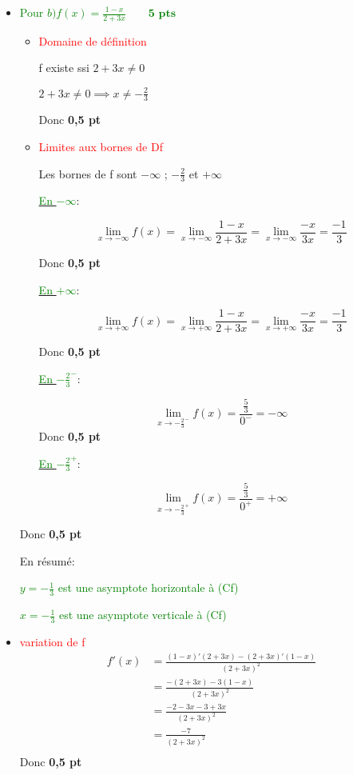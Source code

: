 \documentclass[12pt]{article}
\begin{document}
\begin{itemize}
\item \textcolor{green}{Pour $b)f(x)=\frac{1-x}{2+3x}\quad\quad\textbf{5 pts}$}
\begin{itemize}
\item \textcolor{red}{Domaine de définition}

f existe ssi $2+3x\neq 0$

$2+3x\neq 0 \implies x\neq-\frac{2}{3}$

Donc \textcolor{green}{}\textbf{0,5 pt}

\item \textcolor{red}{Limites aux bornes de Df}

Les bornes de f sont $-\infty$ ; $-\frac{2}{3}$ et $+\infty$

\underline{\textcolor{green}{En $-\infty $}}:

\[\lim_{x \to -\infty}f(x)=\lim_{x \to -\infty}\frac{1-x}{2+3x}=\lim_{x \to -\infty}\frac{-x}{3x}=\frac{-1}{3}\]

Donc \textcolor{green}{}\textbf{0,5 pt}

\underline{\textcolor{green}{En $+\infty $}}:

\[\lim_{x \to +\infty}f(x)=\lim_{x \to +\infty}\frac{1-x}{2+3x}=\lim_{x \to +\infty}\frac{-x}{3x}=\frac{-1}{3}\]

Donc \textcolor{green}{}\textbf{0,5 pt}

\underline{\textcolor{green}{En $-\frac{2}{3}^{-}$}}:

\[\lim_{x \to -\frac{2}{3}^{-}}f(x)=\frac{\frac{5}{3}}{0^{-}}=-\infty\]
Donc \textcolor{green}{}\textbf{0,5 pt}

\underline{\textcolor{green}{En $-\frac{2}{3}^{+}$}}:

\[\lim_{x \to -\frac{2}{3}^{+}}f(x)=\frac{\frac{5}{3}}{0^{+}}=+\infty\]
\end{itemize}

Donc \textcolor{green}{}\textbf{0,5 pt}

En résumé:

\textcolor{green}{$y=-\frac{1}{3}$ est une asymptote horizontale à (Cf)}

\textcolor{green}{$x=-\frac{1}{3}$ est une asymptote verticale à (Cf)}

\item \textcolor{red}{variation de f}
\begin{align*}
f'(x)&=\frac{(1-x)'(2+3x)-(2+3x)'(1-x)}{(2+3x)^{2}}\\
	&=\frac{-(2+3x)-3(1-x)}{(2+3x)^{2}}\\
	&=\frac{-2-3x-3+3x}{(2+3x)^{2}}\\
	&=\frac{-7}{(2+3x)^{2}}\\
\end{align*}
Donc \textcolor{green}{}\textbf{ 0,5 pt}


\end{itemize}
\end{document}
